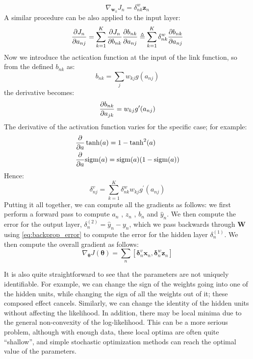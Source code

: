 \begin{equation}
    \nabla_{\bm{w}_k} J_n = \delta_{nk}^w \bm{z}_n
\end{equation}
A similar procedure can be also applied to the input layer:
\begin{equation}
    \pdv{J_n}{a_{nj}} = \sum_{k=1}^K \pdv{J_n}{b_{nk}}\pdv{b_{nk}}{a_{nj}} 
    \triangleq \sum_{k=1}^K \delta_{nk}^w \pdv{b_{nk}}{a_{nj}}
\end{equation}
Now we introduce the actication function at the input of the link function, so from the defined $b_{nk}$ as:
\begin{equation}
    b_{nk} = \sum_j w_{kj} g( a_{nj} )
\end{equation}
the derivative becomes:
\begin{equation}
    \pdv{b_{nk}}{a_{jk}} = w_{kj} g^\prime(a_{nj})
\end{equation}
The derivative of the activation function varies for the specific case; for example:
\begin{align*}
    & \pdv{}{a} \tanh(a) = 1-\tanh^2(a) \\
    & \pdv{}{a} \text{sigm}(a) = \text{sigm}(a)(1-\text{sigm}(a))
\end{align*}
Hence:
\begin{equation}
    \delta_{nj}^v = \sum_{k=1}^K \delta_{nk}^w w_{kj} g^{\prime}(a_{nj})
    \label{eq:backprop_error}
\end{equation}
Putting it all together, we can compute all the gradients as follows: we first perform a forward pass to compute $a_n$ , $z_n$ , $b_n$ and $\hat{y}_n$. We then compute the error for the output layer, $\delta_n^{(2)} = \hat{y}_n - y_n$, which we pass backwards through $\bm{W}$ using \eqref{eq:backprop_error} to compute the error for the hidden layer $\delta_n^{(1)}$. We then compute the overall gradient as follows:
\begin{equation}
    \nabla_{\bm{\theta}} J(\bm{\theta}) = \sum_n \left[ \bm{\delta}_n^v \bm{x}_n, \bm{\delta}_n^w \bm{z}_n \right]
\end{equation}

It is also quite straightforward to see that the parameters are not uniquely identifiable. For example, we can change the sign of the weights going into one of the hidden units, while changing the sign of all the weights out of it; these composed effect cancels. Similarly, we can change the identity of the hidden units without affecting the likelihood. 
In addition, there may be local minima due to the general non-convexity of the log-likelihood. This can be a more serious problem, although with enough data, these local optima are often quite “shallow”, and simple stochastic optimization methods can reach the optimal value of the parameters.

